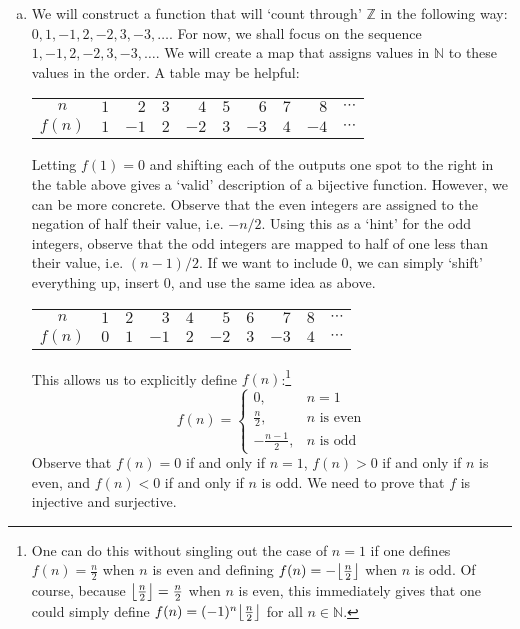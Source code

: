 \documentclass[11pt,letterpaper]{article}
\DeclarePairedDelimiter\floor{\lfloor}{\rfloor}
\begin{document}
\begin{enumerate}[(a)]
\item We will construct a function that will `count through' $\mathbb{Z}$ in the following way: $0, 1, -1, 2, -2, 3, -3, \dots$. For now, we shall focus on the sequence $1, -1, 2, -2, 3, -3, \dots$. We will create a map that assigns values in $\mathbb{N}$ to these values in the order. A table may be helpful: \par
	\begin{table}[ht]
	\centering
	\begin{tabular}{c|rrrrrrrrr}
	$n$ & $1$ & $2$ & $3$ & $4$ & $5$ & $6$ & $7$ & $8$ & $\cdots$ \\
	$f(n)$ & $1$ & $-1$ & $2$ & $-2$ & $3$ & $-3$ & $4$ & $-4$ & $\cdots$
	\end{tabular}
	\end{table} \par
Letting $f(1)= 0$ and shifting each of the outputs one spot to the right in the table above gives a `valid' description of a bijective function. However, we can be more concrete. Observe that the even integers are assigned to the negation of half their value, i.e. $-n/2$. Using this as a `hint' for the odd integers, observe that the odd integers are mapped to half of one less than their value, i.e. $(n - 1)/2$. If we want to include $0$, we can simply `shift' everything up, insert $0$, and use the same idea as above. 
 \par
	\begin{table}[ht]
	\centering
	\begin{tabular}{c|rrrrrrrrr}
	$n$ & $1$ & $2$ & $3$ & $4$ & $5$ & $6$ & $7$ & $8$ & $\cdots$ \\
	$f(n)$ & $0$ & $1$ & $-1$ & $2$ & $-2$ & $3$ & $-3$ & $4$ & $\cdots$
	\end{tabular}
	\end{table} \par
This allows us to explicitly define $f(n)$:\footnote{One can do this without singling out the case of $n= 1$ if one defines $f(n)= \frac{n}{2}$ when $n$ is even and defining $f(n)=  -\floor*{\frac{n}{2}}$ when $n$ is odd. Of course, because $\floor*{\frac{n}{2}}= \frac{n}{2}$ when $n$ is even, this immediately gives that one could simply define $f(n)= (-1)^n  \floor*{\frac{n}{2}}$ for all $n \in \mathbb{N}$.}
	\[
	f(n)= 
	\begin{cases}
	0, & n= 1 \\
	\frac{n}{2}, & n \text{ is even} \\
	-\frac{n - 1}{2}, & n \text{ is odd}
	\end{cases}
	\]
Observe that $f(n)= 0$ if and only if $n= 1$, $f(n) > 0$ if and only if $n$ is even, and $f(n) < 0$ if and only if $n$ is odd. We need to prove that $f$ is injective and surjective. 


\end{enumerate}
\end{document}
